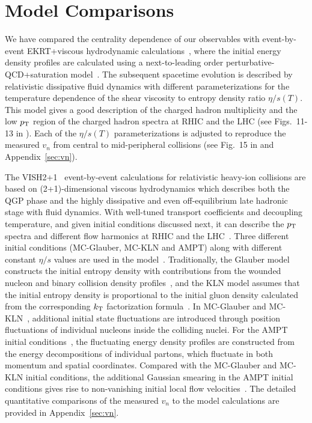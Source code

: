 \section{Model Comparisons}
\label{sec:theory}
We have compared the centrality dependence of our observables with event-by-event EKRT+viscous hydrodynamic calculations~\cite{Niemi:2015qia}, where the initial energy density profiles are calculated using a next-to-leading order perturbative-QCD+saturation model~\cite{Paatelainen:2012at,Paatelainen:2013eea}. The subsequent spacetime evolution is described by relativistic dissipative fluid dynamics with different parameterizations for the temperature dependence of the shear viscosity to entropy density ratio $\eta/s(T)$. 
This model gives a good description of the charged hadron multiplicity and the low $p_{\rm T}$ region of the charged hadron spectra at RHIC and the LHC (see Figs.~11-13 in \cite{Niemi:2015qia}).
Each of the $\eta/s(T)$ parameterizations is adjusted to reproduce the measured $v_n$ from central to mid-peripheral collisions (see Fig.~15 in \cite{Niemi:2015qia} and Appendix~\ref{sec:vn}). 

The VISH2+1~\cite{Shen:2010uy,Shen:2014vra} event-by-event calculations for relativistic heavy-ion collisions are based on (2+1)-dimensional viscous hydrodynamics which describes both the QGP phase and the highly dissipative and even off-equilibrium late hadronic stage with fluid dynamics. With well-tuned transport coefficients and decoupling temperature, and given initial conditions discussed next, it can describe the $p_{\rm T}$ spectra and different flow harmonics at RHIC and the LHC~\cite{Qiu:2011hf, Shen:2010uy, Shen:2011eg, Bhalerao:2015iya}.
Three different initial conditions ({MC-Glauber}, {MC-KLN} and {AMPT}) along with different constant $\eta/s$ values are used in the model~\cite{Zhu:2016puf}. 
Traditionally, the Glauber model constructs the initial entropy density with contributions from the wounded nucleon and binary collision density profiles~\cite{Kolb:2000sd}, and the {KLN} model assumes that the initial entropy density is proportional to the initial gluon density calculated from the corresponding $k_{\rm T}$ factorization formula~\cite{Kharzeev:2000ph}. In {MC-Glauber} and {MC-KLN}~\cite{Miller:2007ri,Drescher:2006ca,Hirano:2009ah}, additional initial state fluctuations are introduced through position fluctuations of individual nucleons inside the colliding nuclei. For the {AMPT} initial conditions~\cite{Bhalerao:2015iya,Pang:2012he,Xu:2016hmp}, the fluctuating energy density profiles are constructed from the energy decompositions of individual partons, which fluctuate in both momentum and spatial coordinates. Compared with the {MC-Glauber} and {MC-KLN} initial conditions, the additional Gaussian smearing in the {AMPT} initial conditions gives rise to non-vanishing initial local flow velocities~\cite{Pang:2012he}. The detailed quantitative comparisons of the measured $v_n$ to the model calculations are provided in Appendix~\ref{sec:vn}.

